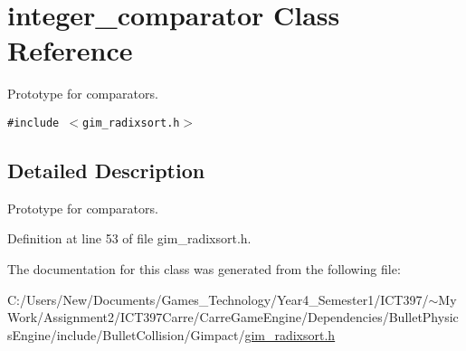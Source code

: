 \hypertarget{classinteger__comparator}{
\section{integer\_\-comparator Class Reference}
\label{classinteger__comparator}
}
Prototype for comparators.  


{\tt \#include $<$gim\_\-radixsort.h$>$}



\subsection{Detailed Description}
Prototype for comparators. 

Definition at line 53 of file gim\_\-radixsort.h.

The documentation for this class was generated from the following file:\begin{CompactItemize}
\item 
C:/Users/New/Documents/Games\_\-Technology/Year4\_\-Semester1/ICT397/$\sim$My Work/Assignment2/ICT397Carre/CarreGameEngine/Dependencies/BulletPhysicsEngine/include/BulletCollision/Gimpact/\hyperlink{gim__radixsort_8h}{gim\_\-radixsort.h}\end{CompactItemize}
